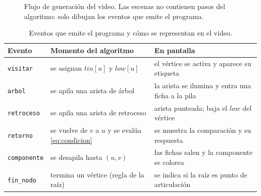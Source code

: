 \documentclass[11pt,a4paper]{article}
\numberwithin{equation}{section}
\newcommand{\tin}{\mathit{tin}}
\newcommand{\low}{\mathit{low}}
\begin{document}
\begin{figure}[H]
\centering
{}
\caption{Flujo de generación del video. Las escenas no contienen pasos del algoritmo: solo dibujan los eventos que emite el programa.}
\label{fig:flujo}
\end{figure}

\begin{table}[H]
\centering
\caption{Eventos que emite el programa y cómo se representan en el video.}
\label{tab:eventos}
\small
\begin{tabular}{l l l}
\toprule
\textbf{Evento} & \textbf{Momento del algoritmo} & \textbf{En pantalla} \\
\midrule
\texttt{visitar}    & se asignan $\tin[u]$ y $\low[u]$            & el vértice se activa y aparece su etiqueta \\
\texttt{arbol}      & se apila una arista de árbol                & la arista se ilumina y entra una ficha a la pila \\
\texttt{retroceso}  & se apila una arista de retroceso            & arista punteada; baja el $\low$ del vértice \\
\texttt{retorno}    & se vuelve de $v$ a $u$ y se evalúa \eqref{eq:condicion} & se muestra la comparación y su respuesta \\
\texttt{componente} & se desapila hasta $(u,v)$                   & las fichas salen y la componente se colorea \\
\texttt{fin\_nodo}  & termina un vértice (regla de la raíz)       & se indica si la raíz es punto de articulación \\
\bottomrule
\end{tabular}
\end{table}
\end{document}

